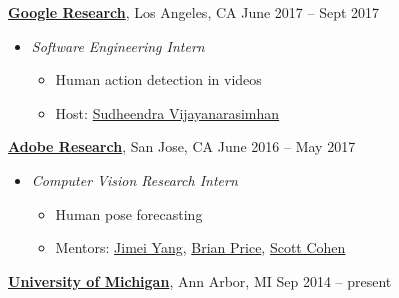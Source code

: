 \documentclass[10pt]{article}
\newenvironment{innerlist}[1][\enskip\textbullet]%
        {\begin{itemize}[#1,leftmargin=*,parsep=0pt,itemsep=0pt,topsep=0pt,partopsep=0pt]}
        {\end{itemize}}
\begin{document}
\href{https://research.google.com/}{\textbf{Google Research}}, Los Angeles, CA \hfill {June 2017 -- Sept 2017} \\
\vspace{-.15in}
\begin{innerlist}
\item[] \emph{Software Engineering Intern} \\
    \vspace{-.15in}
    \begin{innerlist}
    \item Human action detection in videos
    \item Host: \href{https://research.google.com/pubs/105363.html}{Sudheendra Vijayanarasimhan}
    \end{innerlist}
\end{innerlist}
\vspace{.1in}
\href{https://research.adobe.com/}{\textbf{Adobe Research}}, San Jose, CA \hfill {June 2016 -- May 2017} \\
\vspace{-.15in}
\begin{innerlist}
\item[] \emph{Computer Vision Research Intern} \\
    \vspace{-.15in}
    \begin{innerlist}
    \item Human pose forecasting
    \item Mentors: \href{https://research.adobe.com/person/jimei-yang/}{Jimei Yang}, \href{https://research.adobe.com/person/brian-price/}{Brian Price}, \href{https://research.adobe.com/person/scott-cohen/}{Scott Cohen}
    \end{innerlist}
\end{innerlist}
\vspace{.1in}
\href{http://www.umich.edu}{\textbf{University of Michigan}}, Ann Arbor, MI \hfill {Sep 2014 -- present} \\
\vspace{-.15in}
\end{document}
